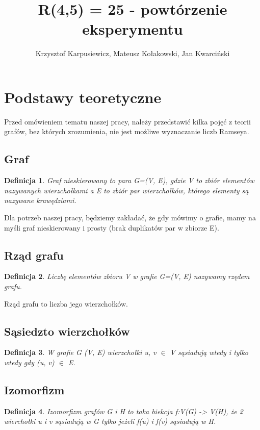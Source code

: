 \documentclass[11pt]{article}
\title{R(4,5) = 25 - powtórzenie eksperymentu}
\author{Krzysztof Karpusiewicz, Mateusz Kołakowski, Jan Kwarciński}
\newtheorem{definition}{Definicja}[section]
\begin{document}
\tableofcontents
\pagebreak

\section{Podstawy teoretyczne}

  Przed omówieniem tematu naszej pracy, należy przedstawić kilka pojęć z teorii grafów, bez których zrozumienia, nie jest możliwe wyznaczanie liczb Ramseya.

  \subsection{Graf}
  \begin{definition}
    Graf nieskierowany to para G=(V, E), gdzie V to zbiór elementów nazywanych wierzchołkami a E to zbiór par wierzchołków, którego elementy są nazywane krawędziami.
  \end{definition}

  Dla potrzeb naszej pracy, będziemy zakładać, że gdy mówimy o grafie, mamy na myśli graf nieskierowany i prosty (brak duplikatów par w zbiorze E).
  
  \subsection{Rząd grafu}
  \begin{definition}
    Liczbę elementów zbioru V w grafie G=(V, E) nazywamy rzędem grafu. 
  \end{definition}

  Rząd grafu to liczba jego wierzchołków. 

  \subsection{Sąsiedzto wierzchołków}
  \begin{definition}
    W grafie G (V, E) wierzchołki u, v $\in$ V sąsiadują wtedy i tylko wtedy gdy (u, v) $\in$ E.    
  \end{definition}

  \subsection{Izomorfizm}

  \begin{definition}
    Izomorfizm grafów G i H to taka biekcja f:V(G) -> V(H), że 2 wierchołki u i v sąsiadują w G tylko jeżeli f(u) i f(v) sąsiadują w H.
  \end{definition}
\end{document}
